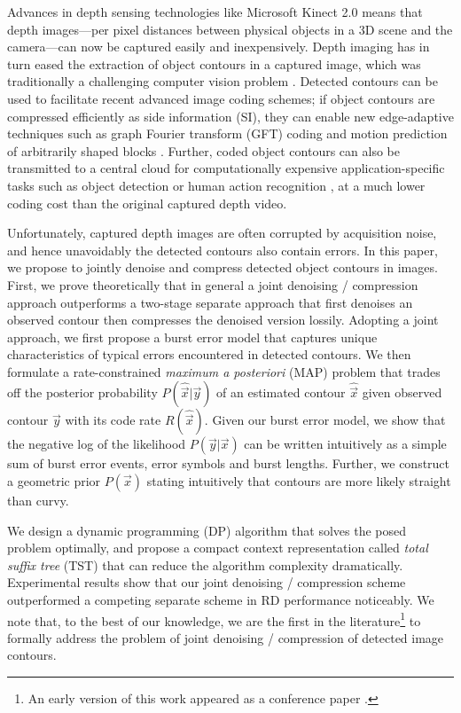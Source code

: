 Advances in depth sensing technologies like Microsoft Kinect 2.0 means that depth images---per pixel distances between physical objects in a 3D scene and the camera---can now be captured easily and inexpensively.
Depth imaging has in turn eased the extraction of object contours in a captured image, which was traditionally a challenging computer vision problem \cite{grigorescu2003contour}.
Detected contours can be used to facilitate recent advanced image coding schemes; if object contours are compressed efficiently as side information (SI), they can enable new edge-adaptive techniques such as graph Fourier transform (GFT) coding \cite{hu15,hu15spl} and motion prediction of arbitrarily shaped blocks \cite{daribo14}. 
Further, coded object contours can also be transmitted to a central cloud for computationally expensive application-specific tasks such as object detection or human action recognition \cite{weinland2011survey}, at a much lower coding cost than the original captured depth video.

Unfortunately, captured depth images are often corrupted by acquisition noise, and hence unavoidably the detected contours also contain errors. 
In this paper, we propose to jointly denoise and compress detected object contours in images.
First, we prove theoretically that in general a joint denoising / compression approach outperforms a two-stage separate approach that first denoises an observed contour then compresses the denoised version lossily.
Adopting a joint approach, we first propose a burst error model that captures unique characteristics of typical errors encountered in detected contours.
We then formulate a rate-constrained \textit{maximum a posteriori} (MAP) problem that trades off the posterior probability $P(\hat{\vec{x}} | \vec{y})$ of an estimated contour $\hat{\vec{x}}$ given observed contour $\vec{y}$ with its code rate $R(\hat{\vec{x}})$. 
Given our burst error model, we show that the negative log of the likelihood $P(\vec{y}|\vec{x})$ can be written intuitively as a simple sum of burst error events, error symbols and burst lengths. 
Further, we construct a geometric prior $P(\vec{x})$ stating intuitively that contours are more likely straight than curvy. 

We design a dynamic programming (DP) \cite{dreyfus1977art} algorithm that solves the posed problem optimally, and propose a compact context representation called \textit{total suffix tree} (TST) that can reduce the algorithm complexity dramatically.
Experimental results show that our joint denoising / compression scheme outperformed a competing separate scheme in RD performance noticeably.
We note that, to the best of our knowledge, we are the first in the literature\footnote{An early version of this work appeared as a conference paper \cite{zheng16}.} to formally address the problem of joint denoising / compression of detected image contours.

